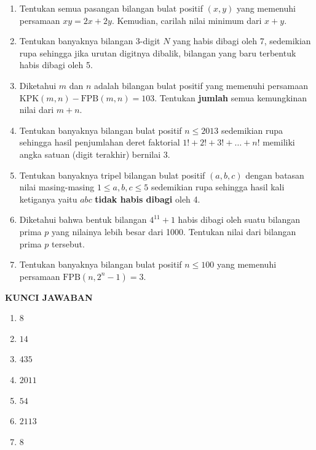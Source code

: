 \documentclass[12pt]{scrartcl}
\begin{document}
\begin{enumerate}[label=\textbf{\arabic*.}]
    
    \item Tentukan semua pasangan bilangan bulat positif $(x, y)$ yang memenuhi persamaan $xy = 2x + 2y$. Kemudian, carilah nilai minimum dari $x + y$.

    \item Tentukan banyaknya bilangan 3-digit $N$ yang habis dibagi oleh 7, sedemikian rupa sehingga jika urutan digitnya dibalik, bilangan yang baru terbentuk habis dibagi oleh 5.

    \item Diketahui $m$ dan $n$ adalah bilangan bulat positif yang memenuhi persamaan $\text{KPK}(m,n) - \text{FPB}(m,n) = 103$. Tentukan \textbf{jumlah} semua kemungkinan nilai dari $m+n$.

    \item Tentukan banyaknya bilangan bulat positif $n \le 2013$ sedemikian rupa sehingga hasil penjumlahan deret faktorial $1! + 2! + 3! + \dots + n!$ memiliki angka satuan (digit terakhir) bernilai 3.

    \item Tentukan banyaknya tripel bilangan bulat positif $(a,b,c)$ dengan batasan nilai masing-masing $1 \le a, b, c \le 5$ sedemikian rupa sehingga hasil kali ketiganya yaitu $abc$ \textbf{tidak habis dibagi} oleh 4.

    \item Diketahui bahwa bentuk bilangan $4^{11}+1$ habis dibagi oleh suatu bilangan prima $p$ yang nilainya lebih besar dari 1000. Tentukan nilai dari bilangan prima $p$ tersebut.

    \item Tentukan banyaknya bilangan bulat positif $n \le 100$ yang memenuhi persamaan $\text{FPB}(n, 2^n-1) = 3$.

\end{enumerate}

\newpage

\begin{center}
    \textbf{KUNCI JAWABAN}
\end{center}
\vspace{0.5cm}

\begin{enumerate}[label=\textbf{\arabic*.}]
    \item $8$ 
    \item $14$
    \item $435$
    \item $2011$
    \item $54$
    \item $2113$
    \item $8$
\end{enumerate}
\end{document}
